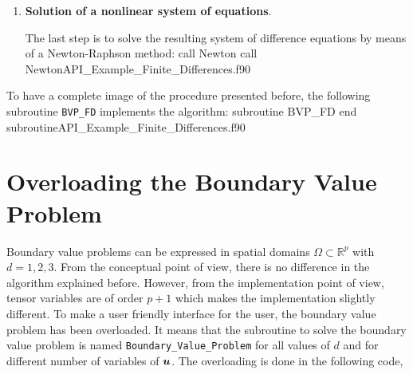 \begin{enumerate}
                \item {\textbf{Solution of a nonlinear system of equations}}.
                
                The last step is to solve the resulting system of difference equations by means of a Newton-Raphson method: 
                \vspace{0.5cm} 
                             {call Newton}
                            {call Newton}{API_Example_Finite_Differences.f90}
                                          
           
          
 \end{enumerate}     
\newpage 
To have a complete image of the procedure presented before, the following subroutine \verb|BVP_FD| implements the algorithm: 
 \vspace{1cm} 
         {subroutine BVP_FD}
         {end subroutine}{API_Example_Finite_Differences.f90}
                                                   
       


     
\newpage        
\section{Overloading the Boundary Value Problem}
Boundary value problems can be expressed in spatial domains   $\Omega \subset \mathbb{ R}^p$ with $ d=1, 2, 3 $. 
From the conceptual point of view, there is no difference in the algorithm explained before. However, from the implementation point of view, 
tensor variables are of order $p+1$ which makes the implementation slightly different. To make a user friendly interface for the user, the boundary value problem has been overloaded. It means that the subroutine to solve the boundary value problem 
is named \verb|Boundary_Value_Problem| for all values of $ d $ and for different number of variables of $ \boldsymbol{u} $.  
The overloading is done in the following code, 

